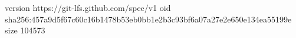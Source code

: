 version https://git-lfs.github.com/spec/v1
oid sha256:457a9d5f67c60c16b1478b53eb0bb1e2b3c93bf6a07a27e2e650e134ea55199e
size 104573
